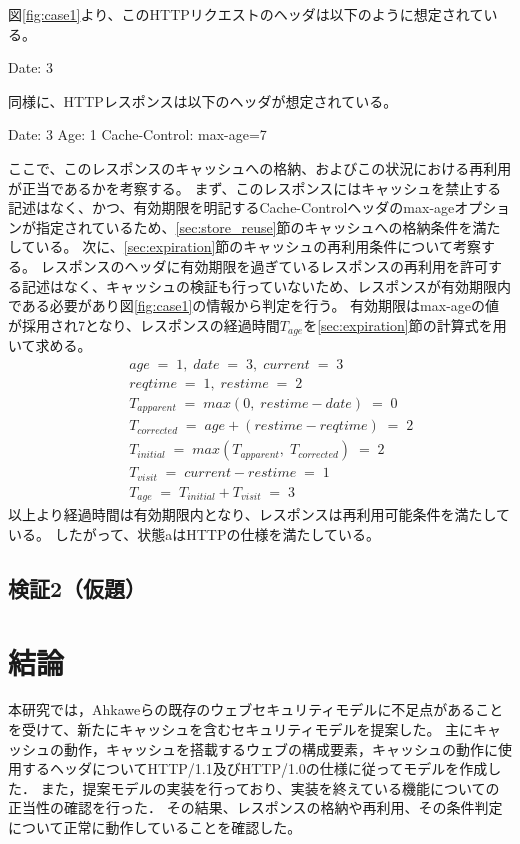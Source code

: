 \documentclass{css}
\begin{document}
図\ref{fig:case1}より、このHTTPリクエストのヘッダは以下のように想定されている。
\begin{verbatimtab}[4]
	Date: 3
\end{verbatimtab}
同様に、HTTPレスポンスは以下のヘッダが想定されている。
\begin{verbatimtab}[4]
	Date: 3
	Age: 1
	Cache-Control: max-age=7
\end{verbatimtab}
ここで、このレスポンスのキャッシュへの格納、およびこの状況における再利用が正当であるかを考察する。
まず、このレスポンスにはキャッシュを禁止する記述はなく、かつ、有効期限を明記するCache-Controlヘッダのmax-ageオプションが指定されているため、\ref{sec:store_reuse}節のキャッシュへの格納条件を満たしている。
次に、\ref{sec:expiration}節のキャッシュの再利用条件について考察する。
レスポンスのヘッダに有効期限を過ぎているレスポンスの再利用を許可する記述はなく、キャッシュの検証も行っていないため、レスポンスが有効期限内である必要があり図\ref{fig:case1}の情報から判定を行う。
有効期限はmax-ageの値が採用され7となり、レスポンスの経過時間$T_{age}$を\ref{sec:expiration}節の計算式を用いて求める。
\begin{eqnarray*}
&&age\;=\;1,\; date\;=\;3,\; current\;=\;3\\
&&reqtime\;=\;1,\; restime\;=\;2\\
&&T_{apparent}\;=\;max(0,\;restime - date)\;=\;0\\
&&T_{corrected}\;=\;age + (restime - reqtime)\;=\;2\\
&&T_{initial}\;=\;max(T_{apparent},\;T_{corrected})\;=\;2\\
&&T_{visit}\;=\;current - restime\;=\;1\\
&&T_{age}\;=\;T_{initial} + T_{visit}\;=\;3
\end{eqnarray*}
以上より経過時間は有効期限内となり、レスポンスは再利用可能条件を満たしている。
したがって、状態aはHTTPの仕様を満たしている。

\subsection{検証2（仮題）}


\section{結論}
本研究では，Ahkaweらの既存のウェブセキュリティモデル\cite{webmodel}に不足点があることを受けて、新たにキャッシュを含むセキュリティモデルを提案した。
主にキャッシュの動作，キャッシュを搭載するウェブの構成要素，キャッシュの動作に使用するヘッダについてHTTP/1.1及びHTTP/1.0の仕様に従ってモデルを作成した．
また，提案モデルの実装を行っており、実装を終えている機能についての正当性の確認を行った．
その結果、レスポンスの格納や再利用、その条件判定について正常に動作していることを確認した。
\end{document}
